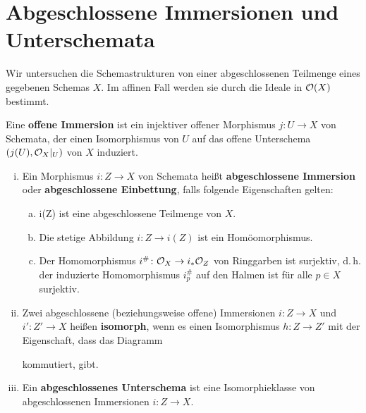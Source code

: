 
\chapter{Abgeschlossene Immersionen und Unterschemata}
Wir untersuchen die Schemastrukturen von einer abgeschlossenen Teilmenge eines gegebenen Schemas $X$. Im affinen Fall werden sie durch die Ideale in $\mathcal{O}(X)$ bestimmt.

\begin{defn}
\label{defn:7.1}
	Eine \textbf{offene Immersion} ist ein injektiver offener Morphismus $j\colon U \to X$ von Schemata, der einen Isomorphismus von $U$ auf das offene Unterschema $(j(U),\mathcal{O}_X\vert_U)$ von $X$ induziert.
\end{defn}

\begin{defn}
\label{defn:7.2}
	\begin{enumerate}[i)]
		\item Ein Morphismus $i \colon Z \to X$ von Schemata heißt \textbf{abgeschlossene Immersion} oder \textbf{abgeschlossene Einbettung}, falls folgende Eigenschaften gelten:
		\begin{enumerate}[a)]
			\item\label{defn:7.2:a} i(Z) ist eine abgeschlossene Teilmenge von $X$.
			\item\label{defn:7.2:b} Die stetige Abbildung $i\colon Z \to i(Z)$ ist ein Homöomorphismus.
			\item\label{defn:7.2:c} Der Homomorphismus $i^{\#}\colon \mathcal{O}_X \to i_*\mathcal{O}_Z$ von Ringgarben ist surjektiv, d.\,h.
			    der induzierte Homomorphismus $i^\#_p$ auf den Halmen ist für alle $p\in X$ surjektiv.
		\end{enumerate}
		\item Zwei abgeschlossene (beziehungsweise offene) Immersionen $i\colon Z \to X$ und $i'\colon Z' \to X$ heißen \textbf{isomorph}, wenn es einen Isomorphismus $h\colon Z \to Z'$ mit der Eigenschaft, dass das Diagramm
		\begin{center}
		\end{center}
		kommutiert, gibt.
		\item Ein \textbf{abgeschlossenes Unterschema} ist eine Isomorphieklasse von abgeschlossenen Immersionen $i \colon Z \to X$.
	\end{enumerate}	
\end{defn}

